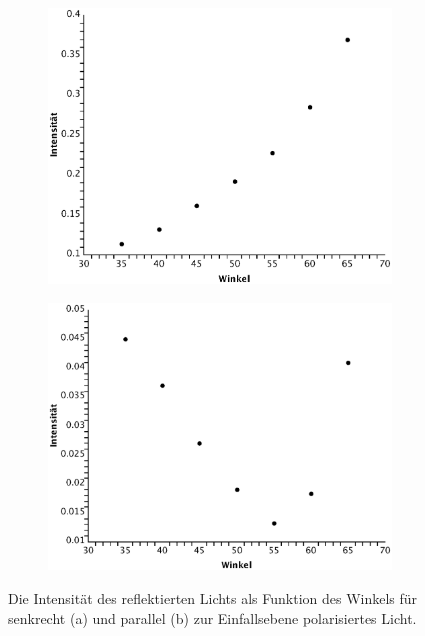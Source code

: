 \documentclass[twoside]{article}
\begin{document}
\begin{center}
\begin{figure}[H]
\begin{subfigure}{0.52\textwidth}
\includegraphics[width=0.9\linewidth]{reflexion_senkrecht.eps}
\caption{}
\end{subfigure}
\begin{subfigure}{0.52\textwidth}
\includegraphics[width=0.9\linewidth]{reflexion_parallel.eps}
\caption{}
\end{subfigure}
\caption{Die Intensität des reflektierten Lichts als Funktion des Winkels für senkrecht (a) und parallel (b) zur Einfallsebene polarisiertes Licht.}
\end{figure}
\label{fig:brewster}
\end{center}
\end{document}
